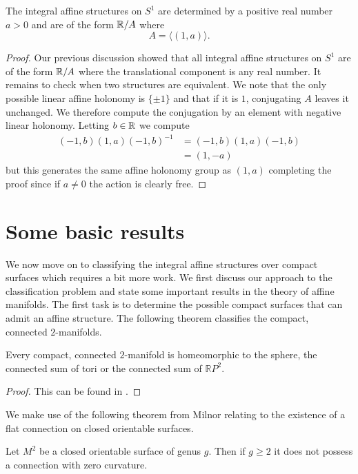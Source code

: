 \begin{lemma}\label{lemma:classification-integral-affine-circles}
    The integral affine structures on $S^1$ are determined by a positive real number $a>0$ and are of the form $\mathbb{R}/A$ where
    $$
        A = \langle (1, a) \rangle.
    $$
\end{lemma}
\begin{proof}
    Our previous discussion showed that all integral affine structures on $S^1$ are of the form $\mathbb{R}/A$ where the translational component is any real number. It remains to check when two structures are equivalent.
    We note that the only possible linear affine holonomy is $\{\pm 1\}$ and that if it is $1$, conjugating $A$ leaves it unchanged. We therefore compute the conjugation by an element with negative linear holonomy.
    Letting $b \in \mathbb{R}$ we compute
    \begin{align*}
        (-1, b)(1,a)(-1,b)^{-1} & = (-1, b)(1,a)(-1,b) \\
                                & = (1,-a)
    \end{align*}
    but this generates the same affine holonomy group as $(1,a)$ completing the proof since if $a \neq 0$ the action is clearly free.
\end{proof}

\section{Some basic results}
We now move on to classifying the integral affine structures over compact
surfaces which requires a bit more work. We first discuss our approach to the
classification problem and state some important results in the theory of affine
manifolds. The first task is to determine the possible compact surfaces that
can admit an affine structure. The following theorem classifies the compact,
connected $2$-manifolds.

\begin{theorem}
    Every compact, connected $2$-manifold is homeomorphic to the sphere, the connected sum of tori or the connected sum of $\mathbb{R}P^2$.
\end{theorem}
\begin{proof}
    This can be found in \cite{Hatcher}.
\end{proof}

We make use of the following theorem from Milnor relating to the existence of a
flat connection on closed orientable surfaces.
\begin{theorem}
    Let $M^2$ be a closed orientable surface of genus $g$. Then if $g \geq 2$ it does not possess a connection with zero curvature.
\end{theorem}

